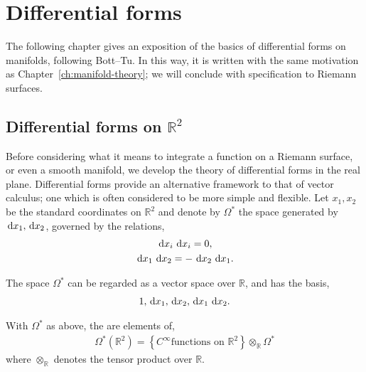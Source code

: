 \chapter{Differential forms}\label{ch:differential-forms}
\begin{chout}
	The following chapter gives an exposition of the basics of differential forms
	on manifolds, following Bott--Tu\sidenotemark. In this way, it is written with
	the same motivation as Chapter~\ref{ch:manifold-theory}; we will conclude with
	specification to Riemann surfaces.
\end{chout}

\section{Differential forms on $ \mathbb{R}^{2} $}
Before considering what it means to integrate a function on a Riemann surface,
or even a smooth manifold, we develop the theory of differential forms in the
real plane. Differential forms provide an alternative framework to that of
vector calculus; one which is often considered to be more simple and
flexible. Let $ x_1, x_2 $ be the standard
coordinates on $ \mathbb{R}^{2} $ and denote by $ \Omega ^{*} $ the space
generated by $ \operatorname{\, d\!}{x_1}, \operatorname{\, d\!}{x_2} $, governed by the relations,
\begin{gather*}
	\operatorname{\, d\!}{x_i}\operatorname{\, d\!}{x_i} = 0,\\
	\operatorname{\, d\!}{x_1}\operatorname{\, d\!}{x_2} = - \operatorname{\, d\!}{x_2}\operatorname{\, d\!}{x_1}.
\end{gather*}

\begin{remark}
	The space $ \Omega ^{*} $ can be regarded as a vector space over $ \mathbb{R}
	$, and has the basis,
	\begin{align*}
		1, \operatorname{\, d\!}{x_1}, \operatorname{\, d\!}{x_2}, \operatorname{\, d\!}{x_1}\operatorname{\, d\!}{x_2}.
	\end{align*}
\end{remark}

\begin{definition}
	With $ \Omega ^{*} $ as above, the 
	are elements of,
	\begin{align*}
		\Omega ^{*}\left(\mathbb{R}^{2}\right) = \left\{ C ^{\infty} \text{
			functions on } \mathbb{R}^{2} \right\} \otimes _{\mathbb{R}} \Omega ^{*}
	\end{align*}
	where $ \otimes _{\mathbb{R}} $ denotes the tensor product over $ \mathbb{R}
	$.
\end{definition}

